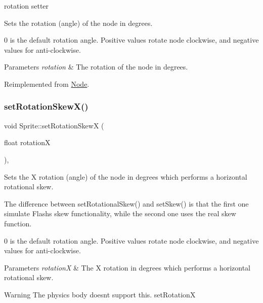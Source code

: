 rotation setter 

Sets the rotation (angle) of the node in degrees.

0 is the default rotation angle. Positive values rotate node clockwise, and negative values for anti-\/clockwise.


\begin{DoxyParams}{Parameters}
{\em rotation} & The rotation of the node in degrees. \\
\hline
\end{DoxyParams}


Reimplemented from \hyperlink{classNode_a62dda439f77712f0d9b405ce887df676}{Node}.

\mbox{\label{classSprite_a8fe7bd093a18a2245c230b96f2c59897}} 
\subsubsection{\texorpdfstring{set\+Rotation\+Skew\+X()}{setRotationSkewX()}\hspace{0.1cm}{\footnotesize\ttfamily [1/2]}}
{\footnotesize\ttfamily void Sprite\+::set\+Rotation\+SkewX (\begin{DoxyParamCaption}\item[{float}]{rotationX }\end{DoxyParamCaption})\hspace{0.3cm}{\ttfamily [override]}, {\ttfamily [virtual]}}

Sets the X rotation (angle) of the node in degrees which performs a horizontal rotational skew.

The difference between {\ttfamily set\+Rotational\+Skew()} and {\ttfamily set\+Skew()} is that the first one simulate Flash\textquotesingle{}s skew functionality, while the second one uses the real skew function.

0 is the default rotation angle. Positive values rotate node clockwise, and negative values for anti-\/clockwise.


\begin{DoxyParams}{Parameters}
{\em rotationX} & The X rotation in degrees which performs a horizontal rotational skew.\\
\hline
\end{DoxyParams}
\begin{DoxyWarning}{Warning}
The physics body doesn\textquotesingle{}t support this.  set\+RotationX 
\end{DoxyWarning}


